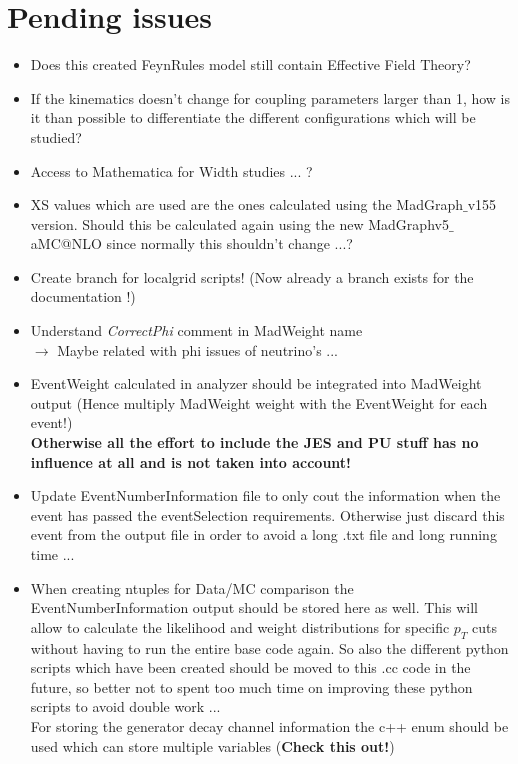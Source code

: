 \documentclass[a4paper,12pt]{report}
\date{Started 4 April 2014 \\ Version: \today}
\begin{document}
\setcounter{secnumdepth}{3} %
\setcounter{tocdepth}{3}    %

\maketitle
\tableofcontents
\newpage

\chapter{Pending issues}
\begin{itemize}
  \item Does this created FeynRules model still contain Effective Field Theory?
  \item If the kinematics doesn't change for coupling parameters larger than 1, how is it than possible to differentiate the different configurations which will be studied?
  \item Access to Mathematica for Width studies ... ?
  \item XS values which are used are the ones calculated using the MadGraph$\_$v155 version. Should this be calculated again using the new MadGraphv5$\_$aMC@NLO since normally this shouldn't change ...?
  \item Create branch for localgrid scripts! (Now already a branch exists for the documentation !)
  \item Understand \textit{CorrectPhi} comment in MadWeight name \\ $\rightarrow$ Maybe related with phi issues of neutrino's ...
  \item EventWeight calculated in analyzer should be integrated into MadWeight output (Hence multiply MadWeight weight with the EventWeight for each event!) \\ \textbf{Otherwise all the effort to include the JES and PU stuff has no influence at all and is not taken into account!							}
  \item Update EventNumberInformation file to only cout the information when the event has passed the eventSelection requirements. Otherwise just discard this event from the output file in order to avoid a long .txt file and long running time ...
  \item When creating ntuples for Data/MC comparison the EventNumberInformation output should be stored here as well. This will allow to calculate the likelihood and weight distributions for specific $p_T$ cuts without having to run the entire base code again. So also the different python scripts which have been created should be moved to this .cc code in the future, so better not to spent too much time on improving these python scripts to avoid double work ...\\ For storing the generator decay channel information the c++ enum should be used which can store multiple variables (\textbf{Check this out!})

\end{itemize}
\end{document}
